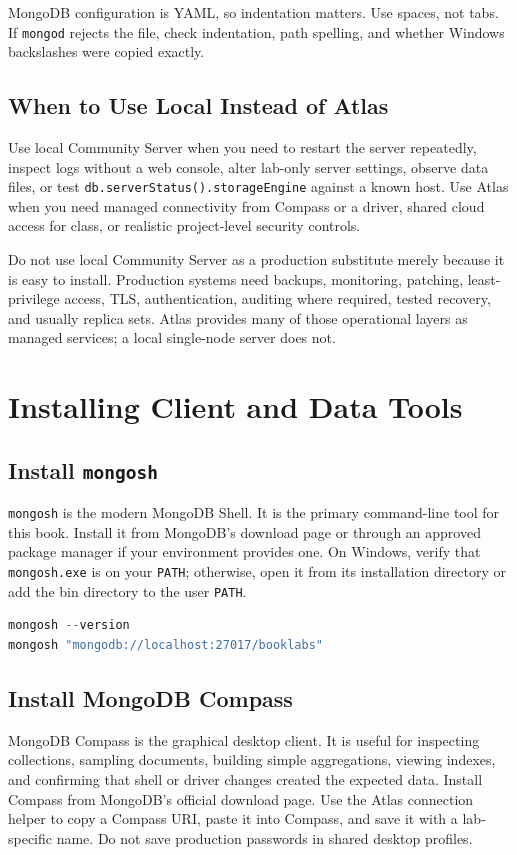 \begin{notebox}
MongoDB configuration is YAML, so indentation matters. Use spaces, not tabs. If \texttt{mongod} rejects the file, check indentation, path spelling, and whether Windows backslashes were copied exactly.
\end{notebox}

\subsection{When to Use Local Instead of Atlas}
Use local Community Server when you need to restart the server repeatedly, inspect logs without a web console, alter lab-only server settings, observe data files, or test \texttt{db.serverStatus().storageEngine} against a known host. Use Atlas when you need managed connectivity from Compass or a driver, shared cloud access for class, or realistic project-level security controls.

Do not use local Community Server as a production substitute merely because it is easy to install. Production systems need backups, monitoring, patching, least-privilege access, TLS, authentication, auditing where required, tested recovery, and usually replica sets. Atlas provides many of those operational layers as managed services; a local single-node server does not.

\section{Installing Client and Data Tools}
\subsection{Install \texttt{mongosh}}
\texttt{mongosh} is the modern MongoDB Shell. It is the primary command-line tool for this book. Install it from MongoDB's download page or through an approved package manager if your environment provides one. On Windows, verify that \texttt{mongosh.exe} is on your \texttt{PATH}; otherwise, open it from its installation directory or add the bin directory to the user \texttt{PATH}.

\begin{lstlisting}[language=PowerShell, caption={Verifying \texttt{mongosh} from PowerShell.}]
mongosh --version
mongosh "mongodb://localhost:27017/booklabs"
\end{lstlisting}

\subsection{Install MongoDB Compass}
MongoDB Compass is the graphical desktop client. It is useful for inspecting collections, sampling documents, building simple aggregations, viewing indexes, and confirming that shell or driver changes created the expected data. Install Compass from MongoDB's official download page. Use the Atlas connection helper to copy a Compass URI, paste it into Compass, and save it with a lab-specific name. Do not save production passwords in shared desktop profiles.


